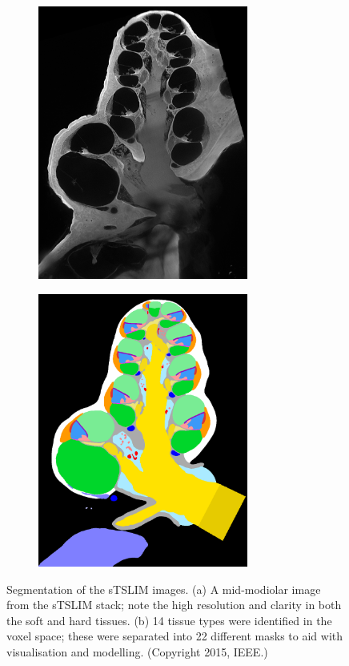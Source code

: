\begin{figure}[t]
	\centering
	
	\begin{subfigure}[t]{0.5\textwidth}
        \centering
        \includegraphics[height=9cm]{Methodology/segmentation_tslim}
        \caption{}
        \label{fig:gp_tslim}
    \end{subfigure}%
    \begin{subfigure}[t]{0.5\textwidth}
        \centering
        \includegraphics[height=9cm]{Methodology/segmentation_masks}
        \caption{}
        \label{fig:gp_masks}
    \end{subfigure}%
    
	\caption[Segmentation of the sTSLIM images]{Segmentation of the sTSLIM images.
	(a) A mid-modiolar image from the sTSLIM stack; note the high resolution and
	clarity in both the soft and hard tissues. (b) 14 tissue types were
	identified in the voxel space; these were separated into 22 different masks to
	aid with visualisation and modelling. (Copyright \textcopyright{} 2015, IEEE.)}
	\label{fig:gp_segmentation}
\end{figure}

